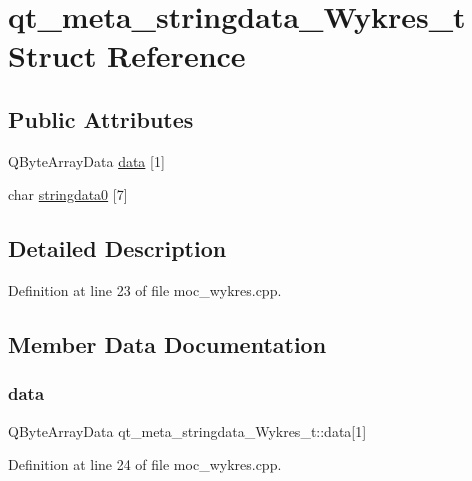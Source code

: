 \hypertarget{structqt__meta__stringdata___wykres__t}{}\section{qt\+\_\+meta\+\_\+stringdata\+\_\+\+Wykres\+\_\+t Struct Reference}
\label{structqt__meta__stringdata___wykres__t}
\subsection*{Public Attributes}
\begin{DoxyCompactItemize}
\item 
Q\+Byte\+Array\+Data \hyperlink{structqt__meta__stringdata___wykres__t_a24ba251dd8fccb592da8b38fdc12ab89}{data} \mbox{[}1\mbox{]}
\item 
char \hyperlink{structqt__meta__stringdata___wykres__t_a3776371d795a32f5ac62a6eff3e1b435}{stringdata0} \mbox{[}7\mbox{]}
\end{DoxyCompactItemize}


\subsection{Detailed Description}


Definition at line 23 of file moc\+\_\+wykres.\+cpp.



\subsection{Member Data Documentation}
\mbox{\label{structqt__meta__stringdata___wykres__t_a24ba251dd8fccb592da8b38fdc12ab89}} 
\subsubsection{\texorpdfstring{data}{data}}
{\footnotesize\ttfamily Q\+Byte\+Array\+Data qt\+\_\+meta\+\_\+stringdata\+\_\+\+Wykres\+\_\+t\+::data\mbox{[}1\mbox{]}}



Definition at line 24 of file moc\+\_\+wykres.\+cpp.


